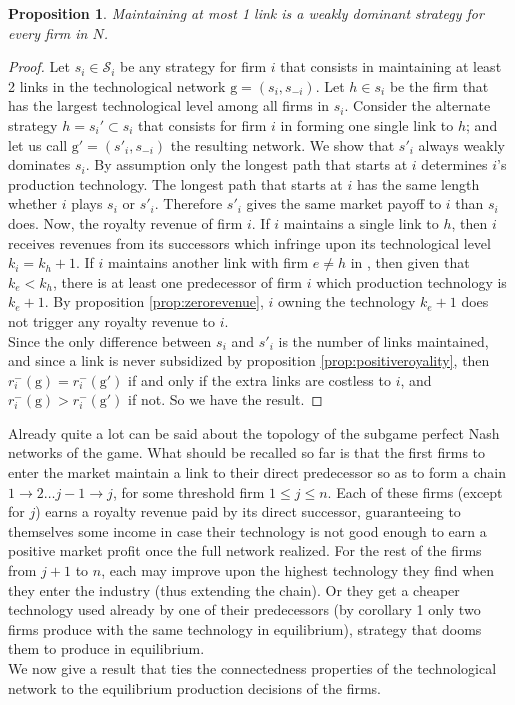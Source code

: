 \documentclass{article}
\newtheorem{proposition}{Proposition}
\begin{document}
\begin{proposition}\label{prop:onelink}
Maintaining at most 1 link is a weakly dominant strategy for every firm in $N$. 
\end{proposition}
\begin{proof}
Let $s_i\in \mathcal{S}_i$ be any strategy for firm $i$ that consists in maintaining at least 2 links in the technological network $\text{g}=(s_i,s_{-i})$. Let $h\in s_i$ be the firm that has the largest technological level among all firms in $s_i$. Consider the alternate strategy $h=s_i'\subset s_i$  that consists for firm $i$ in forming one single link to $h$; and let us call $\text{g}'=(s'_i,s_{-i})$ the resulting network. We show that $s'_i$ always weakly dominates $s_i$. By assumption only the longest path that starts at $i$ determines $i$'s production technology. The longest path that starts at $i$ has the same length whether $i$ plays $s_i$ or $s'_i$. Therefore $s'_i$ gives the same market payoff to $i$ than $s_i$ does.
Now, the royalty revenue of firm $i$. If $i$ maintains a single link to $h$, then $i$ receives revenues from its successors which infringe upon its technological level $k_i=k_h+1$. If $i$ maintains another link with firm $e\neq h$ in , then given that $k_e<k_h$, there is at least one predecessor of firm $i$ which production technology is $k_e+1$. By proposition \ref{prop:zerorevenue}, $i$ owning the technology $k_e+1$ does not trigger any royalty revenue to $i$. \\
Since the only difference between $s_i$ and $s'_i$ is the number of links maintained, and since a link is never subsidized by proposition \ref{prop:positiveroyality}, then $r_i^-(\text{g}) = {r}_i^{-}(\text{g}')$ if and only if the extra links are costless to $i$, and $r_i^-(\text{g}) > {r}_i^{-}(\text{g}')$ if not. So we have the result. 
\end{proof}
Already quite a lot can be said about the topology of the subgame perfect Nash networks of the game. What should be recalled so far is that the first firms to enter the market maintain a link to their direct predecessor so as to form a chain $1\rightarrow 2 \ldots j-1 \rightarrow j$, for some threshold firm $1\leq j\leq n$. Each of these firms (except for $j$) earns a royalty revenue paid by its direct successor, guaranteeing to themselves some income in case their technology is not good enough to earn a positive market profit once the full network realized. For the rest of the firms from $j+1$ to $n$, each may improve upon the highest technology they find when they enter the industry (thus extending the chain). Or they get a cheaper technology used already by one of their predecessors (by corollary 1 only two firms produce with the same technology in equilibrium), strategy that dooms them to produce in equilibrium.\\
\indent We now give a result that ties the connectedness properties of the technological network to the equilibrium production decisions of the firms. \\
 
\end{document}
